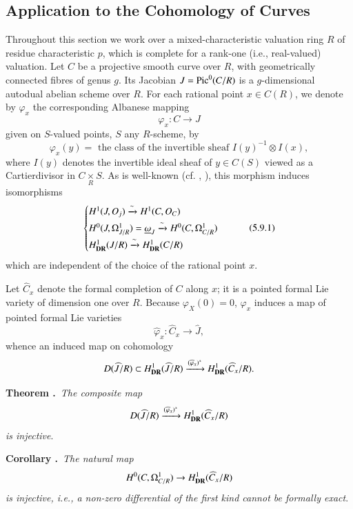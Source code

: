 \subsection{Application to the Cohomology of Curves}\label{art6-sec5.9}
Throughout this section we work over a mixed-characteristic valuation ring $R$ of residue characteristic $p$, which is complete for a rank-one (i.e., real-valued) valuation. Let $C$ be a projective smooth curve over $R$, with geometrically connected fibres of genus $g$. Its Jacobian $J=\operatorname{Pic}^{0}(C/R)$ is a $g$-dimensional autodual abelian scheme over $R$. For each rational point $x\in C(R)$, we denote by $\varphi_{x}$ the corresponding Albanese mapping 
$$
\varphi_{x} : C\to J
$$
given on $S$-valued points, $S$ any $R$-scheme, by
$$
\varphi_{x}(y)=\text{~the class of the invertible sheaf~}I(y)^{-1}\otimes I(x),
$$
where $I(y)$ denotes the invertible ideal sheaf of $y\in C(S)$ viewed as a Cartier\pageoriginale divisor in $C{\displaystyle{\mathop{\times}\limits_{R}}}S$. As is well-known (cf. \cite{art6-key44}, \cite{art6-key45}), this morphism induces isomorphisms
\begin{equation*}
\begin{cases}
H^{1}(J,O_{j})\xrightarrow{\sim} H^{1}(C,O_{C})\\[3pt]
H^{0}(J,\Omega^{1}_{J/R})=\underline{\omega}_{J}\xrightarrow{\sim}H^{0}(C,\Omega^{1}_{C/R})\\[3pt]
H^{1}_{\mathbf{DR}}(J/R)\xrightarrow{\sim} H^{1}_{\mathbf{DR}}(C/R)
\end{cases}\tag{5.9.1}\label{art6-eq5.9.1}
\end{equation*}
which are independent of the choice of the rational point $x$.

Let $\widehat{C}_{x}$ denote the formal completion of $C$ along $x$; it is a pointed formal Lie variety of dimension one over $R$. Because $\varphi_{X}(0)=0$, $\varphi_{x}$ induces a map of pointed formal Lie varieties
$$
\widehat{\varphi}_{x}:\widehat{C}_{x}\to \widehat{J},
$$
whence an induced map on cohomology
$$
D(\widehat{J}/R)\subset H^{1}_{\mathbf{DR}}(\widehat{J}/R)\xrightarrow{(\widehat{\varphi}_{x})^{*}}H^{1}_{\mathbf{DR}}(\widehat{C}_{x}/R).
$$

\medskip
\noindent
{\bf Theorem .\label{art6-thm5.9.2}}~{\em The composite map}
$$
D(\widehat{J}/R)\xrightarrow{(\widehat{\varphi}_{x})^{*}}H^{1}_{\mathbf{DR}}(\widehat{C}_{x}/R)
$$
{\em is injective}.

\medskip
\noindent
{\bf Corollary .\label{art6-coro5.9.3}}~{\em The natural map}
$$
H^{0}(C,\Omega^{1}_{C/R})\to H^{1}_{\mathbf{DR}}(\widehat{C}_{x}/R)
$$
{\em is injective, i.e., a non-zero differential of the first kind cannot be formally exact}.
\smallskip

